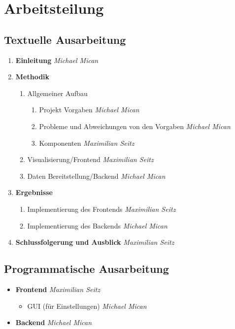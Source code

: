 \section*{Arbeitsteilung}

\newcommand{\by}[1]{\hfill\textsl{#1}}


\subsection*{Textuelle Ausarbeitung}

\begin{enumerate}[label*=\arabic*.]
	\item \textbf{Einleitung} \by{Michael Mican}
	
	\item \textbf{Methodik}
	
	\begin{enumerate}[label*=\arabic*.]
		\item Allgemeiner Aufbau
		
		\begin{enumerate}[label*=\arabic*.]
			\item Projekt Vorgaben \by{Michael Mican}
			\item Probleme und Abweichungen von den Vorgaben \by{Michael Mican}
			\item Komponenten \by{Maximilian Seitz}
		\end{enumerate}
		
		\item Visualisierung/Frontend \by{Maximilian Seitz}
		
		\item Daten Bereitstellung/Backend \by{Michael Mican}
	\end{enumerate}
	
	\item \textbf{Ergebnisse}
	
	\begin{enumerate}[label*=\arabic*.]
		\item Implementierung des Frontends \by{Maximilian Seitz}
		
		\item Implementierung des Backends \by{Michael Mican}
	\end{enumerate}
	
	\item \textbf{Schlussfolgerung und Ausblick} \by{Maximilian Seitz}
\end{enumerate}


\subsection*{Programmatische Ausarbeitung}

\begin{itemize}
	\item \textbf{Frontend} \by{Maximilian Seitz}
	
	\begin{itemize}
		\item GUI (für Einstellungen) \by{Michael Mican}
	\end{itemize}
	
	\item \textbf{Backend} \by{Michael Mican}
\end{itemize}
